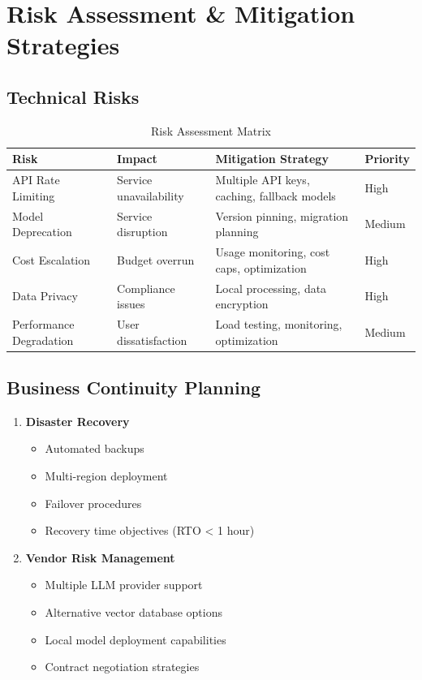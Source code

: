 \documentclass[12pt,a4paper]{article}
\begin{document}
\section{Risk Assessment \& Mitigation Strategies}

\subsection{Technical Risks}

\begin{table}[H]
\centering
\begin{tabular}{@{}p{3cm}p{4cm}p{4cm}p{2cm}@{}}
\toprule
\textbf{Risk} & \textbf{Impact} & \textbf{Mitigation Strategy} & \textbf{Priority} \\
\midrule
API Rate Limiting & Service unavailability & Multiple API keys, caching, fallback models & High \\
Model Deprecation & Service disruption & Version pinning, migration planning & Medium \\
Cost Escalation & Budget overrun & Usage monitoring, cost caps, optimization & High \\
Data Privacy & Compliance issues & Local processing, data encryption & High \\
Performance Degradation & User dissatisfaction & Load testing, monitoring, optimization & Medium \\
\bottomrule
\end{tabular}
\caption{Risk Assessment Matrix}
\end{table}

\subsection{Business Continuity Planning}

\begin{enumerate}
    \item \textbf{Disaster Recovery}
    \begin{itemize}
        \item Automated backups
        \item Multi-region deployment
        \item Failover procedures
        \item Recovery time objectives (RTO < 1 hour)
    \end{itemize}
    
    \item \textbf{Vendor Risk Management}
    \begin{itemize}
        \item Multiple LLM provider support
        \item Alternative vector database options
        \item Local model deployment capabilities
        \item Contract negotiation strategies
    \end{itemize}
\end{enumerate}
\end{document}
